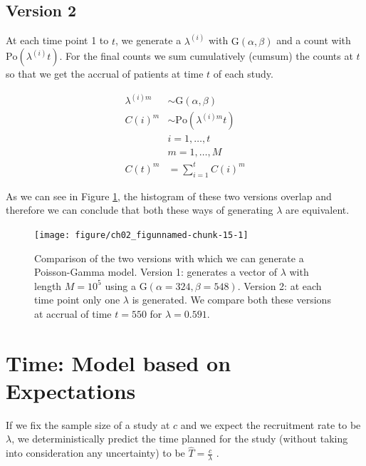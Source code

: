 \subsection{Version 2}

At each time point 1 to $t$, we generate a $\lambda^{(i)}$ with $\textrm{G}(\alpha, \beta)$ and a count with $\textrm{Po}(\lambda^{(i)} t)$. For the final counts we sum cumulatively (cumsum) the counts at $t$ so that we get the accrual of patients at time $t$ of each study.

\begin{align*}
\lambda^{(i)m} &\sim \textrm{G}(\alpha, \beta) \\
C (i)^m&\sim \textrm{Po} (\lambda^{(i)m} t)\\
& i = 1, \ldots, t \\
& m = 1, \ldots, M \\
C(t)^m &= \sum_{i=1}^tC(i)^m
\end{align*}


As we can see in Figure \ref{fig:2_12}, the histogram of these two versions overlap and therefore we can conclude that both these ways of generating $\lambda$ are equivalent.


\begin{figure}
\begin{knitrout}
\color{fgcolor}

{\centering \texttt{[image: figure/ch02\_figunnamed-chunk-15-1]} 

}


\end{knitrout}
  \caption{Comparison of the two versions with which we can generate a Poisson-Gamma model. Version 1: generates a vector of $\lambda$ with length $M=10^5$ using a $\textrm{G}(\alpha = 324, \beta = 548)$. Version 2: at each time point only one $\lambda$ is generated. We compare both these versions at accrual of time $t=550$ for $\lambda=0.591$.}
  \label{fig:2_12}
\end{figure}

\section{Time: Model based on Expectations}

If we fix the sample size of a study at $c$ and we expect the recruitment rate to be $\lambda$, we deterministically predict the time planned for the study (without taking into consideration any uncertainty) to be $\hat{T}=\frac{c}{\lambda}$ \citep{bagiella2001predicting}.

